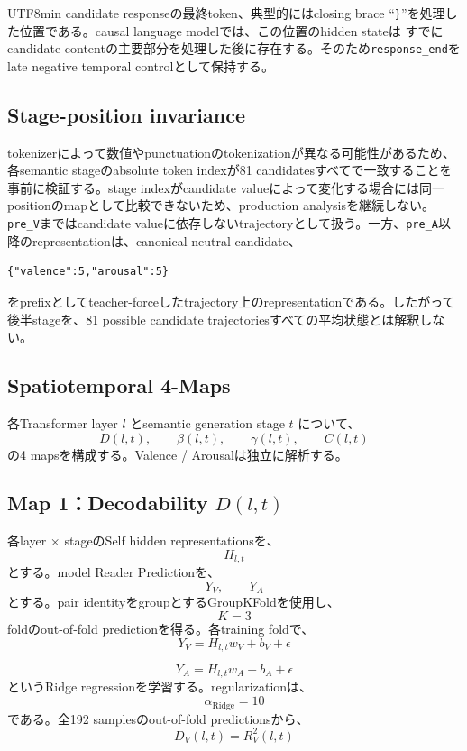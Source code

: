 \documentclass{article} %
\begin{document}
\begin{CJK*}{UTF8}{min}
candidate responseの最終token、典型的にはclosing brace ``\texttt{\}}''を処理した位置である。causal language modelでは、この位置のhidden stateは
すでにcandidate contentの主要部分を処理した後に存在する。そのため\texttt{response\_end}をlate negative temporal controlとして保持する。


\subsection{Stage-position invariance}

tokenizerによって数値やpunctuationのtokenizationが異なる可能性があるため、各semantic stageのabsolute token indexが81 candidatesすべてで一致することを事前に検証する。stage indexがcandidate valueによって変化する場合には同一positionのmapとして比較できないため、production analysisを継続しない。\texttt{pre\_V}まではcandidate valueに依存しないtrajectoryとして扱う。一方、\texttt{pre\_A}以降のrepresentationは、canonical neutral candidate、
\begin{verbatim}
{"valence":5,"arousal":5}
\end{verbatim}
をprefixとしてteacher-forceしたtrajectory上のrepresentationである。したがって後半stageを、81 possible candidate trajectoriesすべての平均状態とは解釈しない。


\subsection{Spatiotemporal 4-Maps}

各Transformer layer \(l\) とsemantic generation stage \(t\) について、
\[
D(l,t),
\qquad
\beta(l,t),
\qquad
\gamma(l,t),
\qquad
C(l,t)
\]
の4 mapsを構成する。Valence / Arousalは独立に解析する。


\subsection{Map 1：Decodability \(D(l,t)\)}

各layer × stageのSelf hidden representationsを、
\[
H_{l,t}
\]
とする。model Reader Predictionを、
\[
Y_V,
\qquad
Y_A
\]
とする。pair identityをgroupとするGroupKFoldを使用し、
\[
K=3
\]
foldのout-of-fold predictionを得る。各training foldで、
\[
Y_V
=
H_{l,t}w_V+b_V+\epsilon
\]

\[
Y_A
=
H_{l,t}w_A+b_A+\epsilon
\]
というRidge regressionを学習する。regularizationは、
\[
\alpha_{\mathrm{Ridge}}=10
\]
である。全192 samplesのout-of-fold predictionsから、
\[
D_V(l,t)
=
R_V^2(l,t)
\]


\end{CJK*}
\end{document}
